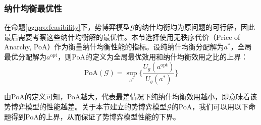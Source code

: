 \subsubsection{纳什均衡最优性}
\label{pg:mWLU:pgoptimal}

在命题\ref{pg:pro:feasibility}下，势博弈模型$\mathcal{G}$的纳什均衡均为原问题的可行解，因此最后需要考察这些纳什均衡解的最优性。本节选择使用无秩序代价（Price of Anarchy, PoA）作为衡量纳什均衡性能的指标。设纯纳什均衡分配解为$a^*$，全局最优分配解为$a^{\text{opt}}$，则PoA的定义为全局最优效用和纳什均衡效用之比的上界：
\begin{equation}
\label{pg:eq:PoA}
	\mathrm{PoA}(\mathcal{G}) = \sup_{a^*} \Big\{ \frac{U_g(a^{\text{opt}})}{U_g(a^*)} \Big\}
\end{equation}

由PoA的定义可知，PoA越大，代表最差情况下纯纳什均衡效用越小，即意味着该势博弈模型的性能越差。关于本节建立的势博弈模型$\mathcal{G}$的PoA，我们可以用以下命题得到PoA的上界，从而保证了势博弈模型性能的下界。

